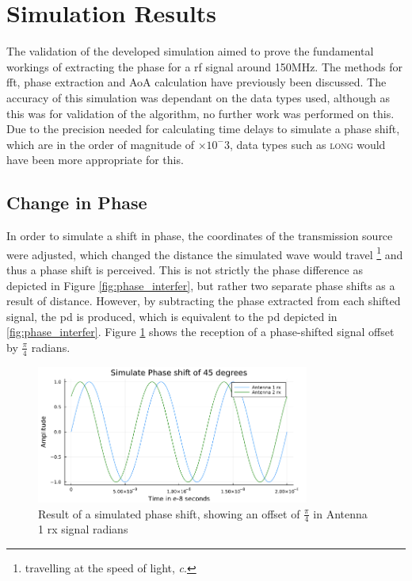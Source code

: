 \documentclass[class=report,11pt,crop=false]{standalone}
\begin{document}
\section{Simulation Results \label{sec:results-sim}}
The validation of the developed simulation aimed to prove the fundamental workings of extracting the phase for a \gls{rf} signal around 150MHz. The methods for \gls{fft}, phase extraction and \gls{AoA} calculation have previously been discussed. The accuracy of this simulation was dependant on the data types used, although as this was for validation of the algorithm, no further work was performed on this. Due to the precision needed for calculating time delays to simulate a phase shift, which are in the order of magnitude of $\times 10^-3$, data types such as \textsc{long} would have been more appropriate for this. 

\subsection{Change in Phase}
In order to simulate a shift in phase, the coordinates of the transmission source were adjusted, which changed the distance the simulated wave would travel \footnote{travelling at the speed of light, \emph{c}.} and thus a phase shift is perceived. This is not strictly the phase difference as depicted in Figure \ref{fig:phase_interfer}, but rather two separate phase shifts as a result of distance. However, by subtracting the phase extracted from each shifted signal, the \gls{pd} is produced, which is equivalent to the \gls{pd} depicted in \ref{fig:phase_interfer}. Figure \ref{fig:phaseshift} shows the reception of a phase-shifted signal offset by $\frac{\pi}{4}$ radians. 

\begin{figure}[h]
    \centering
    \includegraphics[width=0.8\textwidth]{Images/plots/phaseshift-sim.png}
    \caption{Result of a simulated phase shift, showing an offset of $\frac{\pi}{4}$ in Antenna 1 rx signal radians}
    \label{fig:phaseshift}
\end{figure}
\end{document}
